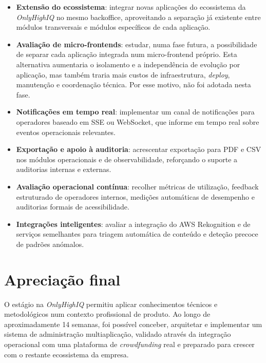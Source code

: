 \begin{itemize}
  \item \textbf{Extensão do ecossistema}: integrar novas aplicações do ecossistema da \textit{OnlyHighIQ} no mesmo backoffice, aproveitando a separação já existente entre módulos transversais e módulos específicos de cada aplicação.

  \item \textbf{Avaliação de micro-frontends}: estudar, numa fase futura, a possibilidade de separar cada aplicação integrada num micro-frontend próprio. Esta alternativa aumentaria o isolamento e a independência de evolução por aplicação, mas também traria mais custos de infraestrutura, \textit{deploy}, manutenção e coordenação técnica. Por esse motivo, não foi adotada nesta fase.

  \item \textbf{Notificações em tempo real}: implementar um canal de notificações para operadores baseado em \gls{SSE} ou WebSocket, que informe em tempo real sobre eventos operacionais relevantes.

  \item \textbf{Exportação e apoio à auditoria}: acrescentar exportação para \gls{PDF} e \gls{CSV} nos módulos operacionais e de observabilidade, reforçando o suporte a auditorias internas e externas.

  \item \textbf{Avaliação operacional contínua}: recolher métricas de utilização, feedback estruturado de operadores internos, medições automáticas de desempenho e auditorias formais de acessibilidade.

  \item \textbf{Integrações inteligentes}: avaliar a integração do AWS Rekognition e de serviços semelhantes para triagem automática de conteúdo e deteção precoce de padrões anómalos.
\end{itemize}


\section{Apreciação final}
\label{sec:apreciacao_final}

O estágio na \textit{OnlyHighIQ} permitiu aplicar conhecimentos técnicos e metodológicos num contexto profissional de produto. Ao longo de aproximadamente 14 semanas, foi possível conceber, arquitetar e implementar um sistema de administração multiaplicação, validado através da integração operacional com uma plataforma de \textit{crowdfunding} real e preparado para crescer com o restante ecossistema da empresa.

